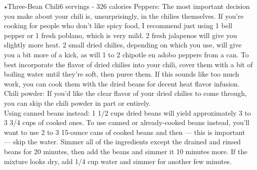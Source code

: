 \begin{recipe}{$\star$Three-Bean Chili}{6 servings - 326 calories}{}
Peppers: The most important decision you make about your chili is, unsurprisingly, in the chilies themselves. If you're cooking for people who don't like spicy food, I recommend just using 1 bell pepper or 1 fresh poblano, which is very mild. 2 fresh jalapenos will give you slightly more heat. 2 small dried chilies, depending on which you use, will give you a bit more of a kick, as will 1 to 2 chipotle en adobo peppers from a can. To best incorporate the flavor of dried chilies into your chili, cover them with a bit of boiling water until they’re soft, then puree them. If this sounds like too much work, you can cook them with the dried beans for decent heat flavor infusion.\\

Chili powder: If you’d like the clear flavor of your dried chilies to come through, you can skip the chili powder in part or entirely.\\

Using canned beans instead: 1 1/2 cups dried beans will yield approximately 3 to 3 3/4 cups of cooked ones. To use canned or already-cooked beans instead, you’ll want to use 2 to 3 15-ounce cans of cooked beans and then — this is important — skip the water. Simmer all of the ingredients except the drained and rinsed beans for 20 minutes, then add the beans and simmer it 10 minutes more. If the mixture looks dry, add 1/4 cup water and simmer for another few minutes.

\end{recipe}